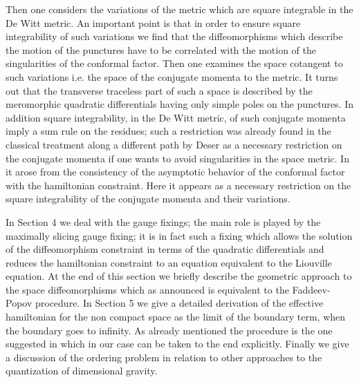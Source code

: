 \documentclass[a4paper,12pt]{article}
\begin{document}
Then one considers the variations of the metric which are square
integrable in the De Witt metric. An important point is that in order
to ensure square integrability of such variations we find that the
diffeomorphisms which describe the motion of the punctures have to be
correlated with the motion of the singularities of the conformal
factor. Then one examines the space cotangent to such variations
i.e. the space of the conjugate momenta to the metric. It turns out
that the transverse traceless part of such a space is described by the
meromorphic quadratic differentials having only simple poles on the
punctures. In addition square integrability, in the De Witt metric, of
such conjugate momenta imply a sum rule on the residues; such a
restriction was already found in the classical treatment along a
different path by Deser \cite{deser} as a
necessary restriction on the conjugate momenta if one wants to avoid
singularities in the space metric. In \cite{CMS1,MS1} it arose from
the consistency of the asymptotic behavior of the conformal factor
with the hamiltonian constraint. Here it appears as a necessary
restriction on the square integrability of the conjugate momenta and
their variations.

In Section 4 we deal with the gauge fixings; the main role is played
by the maximally slicing gauge fixing; it is in fact such a fixing
which allows the solution of the diffeomorphism constraint in terms of
the quadratic differentials and reduces the hamiltonian constraint to
an equation equivalent to the Liouville equation.  At the end of this
section we briefly describe the geometric approach to the space
diffeomorphisms which as announced is equivalent to the Faddeev-Popov
procedure. In Section 5 we give a detailed derivation of the effective
hamiltonian for the non compact space as the limit of the boundary
term, when the boundary goes to infinity. As already mentioned the
procedure is the one suggested in \cite{hawkinghunter} which in our
case can be taken to the end explicitly. Finally we give a discussion
of the ordering problem in relation to other approaches to the
quantization of \coordHE{} dimensional gravity.

    
\end{document}
